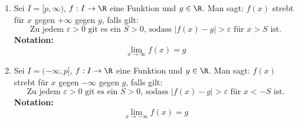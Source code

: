 \begin{enumerate}
    \item Sei $I = [p, \infty)$, $f: I \to \R$ eine Funktion und $g \in \R$. Man sagt: $f(x)$ strebt für $x$ gegen $+\infty$ gegen $g$, falls gilt:
    $$\text{Zu jedem $\varepsilon > 0$ git es ein $S > 0$, sodass $|f(x)-g| > \varepsilon$ für $x > S$ ist.}$$
    \textbf{Notation:} $$\lim_{x \to \infty} f(x) = g$$
    \item Sei $I = (-\infty, p]$, $f: I \to \R$ eine Funktion und $g \in \R$. Man sagt: $f(x)$ strebt für $x$ gegen $-\infty$ gegen $g$, falls gilt:
    $$\text{Zu jedem $\varepsilon > 0$ git es ein $S > 0$, sodass $|f(x)-g| > \varepsilon$ für $x < -S$ ist.}$$
    \textbf{Notation:} $$\lim_{x \to -\infty} f(x) = g$$
\end{enumerate}